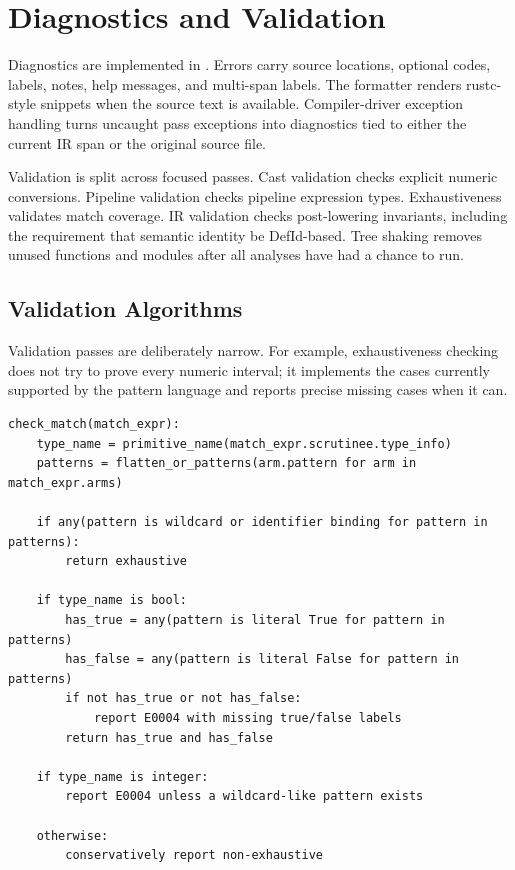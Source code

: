\section{Diagnostics and Validation}

Diagnostics are implemented in . Errors
carry source locations, optional codes, labels, notes, help messages, and
multi-span labels. The formatter renders rustc-style snippets when the source
text is available. Compiler-driver exception handling turns uncaught pass
exceptions into diagnostics tied to either the current IR span or the original
source file.

Validation is split across focused passes. Cast validation checks explicit
numeric conversions. Pipeline validation checks pipeline expression types.
Exhaustiveness validates match coverage. IR validation checks post-lowering
invariants, including the requirement that semantic identity be DefId-based.
Tree shaking removes unused functions and modules after all analyses have had a
chance to run.

\subsection{Validation Algorithms}

Validation passes are deliberately narrow. For example, exhaustiveness checking
does not try to prove every numeric interval; it implements the cases currently
supported by the pattern language and reports precise missing cases when it
can.

\begin{lstlisting}[style=pythoncode,caption={Current match exhaustiveness check.}]
check_match(match_expr):
    type_name = primitive_name(match_expr.scrutinee.type_info)
    patterns = flatten_or_patterns(arm.pattern for arm in match_expr.arms)

    if any(pattern is wildcard or identifier binding for pattern in patterns):
        return exhaustive

    if type_name is bool:
        has_true = any(pattern is literal True for pattern in patterns)
        has_false = any(pattern is literal False for pattern in patterns)
        if not has_true or not has_false:
            report E0004 with missing true/false labels
        return has_true and has_false

    if type_name is integer:
        report E0004 unless a wildcard-like pattern exists

    otherwise:
        conservatively report non-exhaustive
\end{lstlisting}

